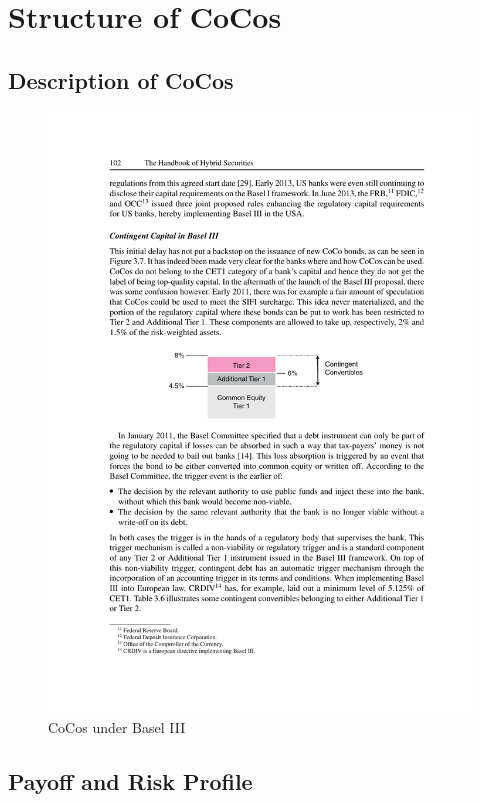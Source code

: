 \chapter{Structure of CoCos}

\section{Description of CoCos}

\begin{figure}[ht]
	\centering
	\includegraphics[trim=0.1cm 0.1cm 0.2cm 0.1cm, scale = 1]{media/basel3} \par
	\caption[CoCos under Basel III]{CoCos under Basel III \citep{de2011handbook}}
\end{figure}

\section{Payoff and Risk Profile}

